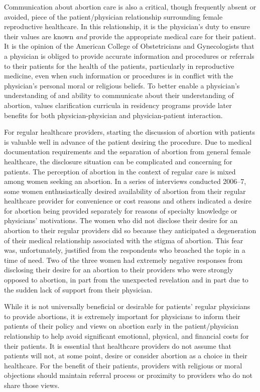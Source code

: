 \documentclass[letterpaper, 12pt]{article}
\begin{document}
Communication about abortion care is also a critical, though frequently absent or avoided, piece of the patient/physician relationship surrounding female reproductive healthcare. In this relationship, it is the physician's duty to ensure their values are known \textit{and} provide the appropriate medical care for their patient.
It is the opinion of the American College of Obstetricians and Gynecologists that a physician is obliged to provide accurate information and procedures or referrals to their patients for the health of the patients, particularly in reproductive medicine, even when such information or procedures is in conflict with the physician's personal moral or religious beliefs. \autocite[pg. 1]{_limits_2007}
To better enable a physician's understanding of and ability to communicate about their understanding of abortion, values clarification curricula in residency programs provide later benefits for both physician-physician and physician-patient interaction. \autocite[pg. 150]{freedman_obstacles_2010}

For regular healthcare providers, starting the discussion of abortion with patients is valuable well in advance of the patient desiring the procedure.
Due to medical documentation requirements and the separation of abortion from general female healthcare, the disclosure situation can be complicated and concerning for patients. \autocite[pg. 410, 412]{weitz_abortion_2010}
The perception of abortion in the context of regular care is mixed among women seeking an abortion.
In a series of interviews conducted 2006--7, some women enthusiastically desired availability of abortion from their regular healthcare provider for convenience or cost reasons and others indicated a desire for abortion being provided separately for reasons of specialty knowledge or physicians' motivations. \autocite[pg. 411--2]{weitz_abortion_2010}
The women who did not disclose their desire for an abortion to their regular providers did so because they anticipated a degeneration of their medical relationship associated with the stigma of abortion. \autocite[pg. 412]{weitz_abortion_2010}
This fear was, unfortunately, justified from the respondents who broached the topic in a time of need.
Two of the three women had extremely negative responses from disclosing their desire for an abortion to their providers who were strongly opposed to abortion, in part from the unexpected revelation and in part due to the sudden lack of support from their physician. \autocite[pg. 412-3]{weitz_abortion_2010}

While it is not universally beneficial or desirable for patients' regular physicians to provide abortions, it is extremely important for physicians to inform their patients of their policy and views on abortion early in the patient/physician relationship to help avoid significant emotional, physical, and financial costs for their patients. \autocite[pg. 413]{weitz_abortion_2010}
It is essential that healthcare providers do not assume that patients will not, at some point, desire or consider abortion as a choice in their healthcare.
For the benefit of their patients, providers with religious or moral objections should maintain referral process or proximity to providers who do not share those views. \autocite[pg. 1]{_limits_2007}
\end{document}
